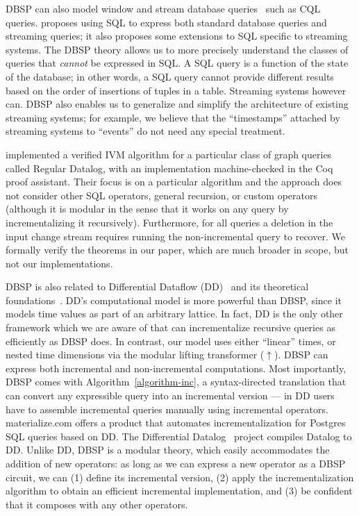 \documentclass[twocolumn
]{svjour3}
\numberwithin{equation}{section}
\newcommand{\dbsp}{DBSP\xspace}
\newcommand{\lift}[1]{{\uparrow}#1}
\begin{document}
\dbsp can also model window and stream database
queries~\cite{arasu-tr02,aurora} such as CQL queries.
\cite{begoli-sigmod19} proposes using SQL to express both standard
database queries and streaming queries; it also proposes some
extensions to SQL specific to streaming systems.  The \dbsp theory
allows us to more precisely understand the classes of queries that
\emph{cannot} be expressed in SQL.  A SQL query is a function of the
state of the database; in other words, a SQL query cannot provide
different results based on the order of insertions of tuples in a
table.  Streaming systems however can.  \dbsp also enables us to
generalize and simplify the architecture of existing streaming
systems; for example, we believe that the ``timestamps'' attached by
streaming systems to ``events'' do not need any special treatment.

\cite{bonifati-iclp2018} implemented a verified IVM algorithm for a
particular class of graph queries called Regular Datalog, with an
implementation machine-checked in the Coq proof assistant. Their focus
is on a particular algorithm and the approach does not consider other
SQL operators, general recursion, or custom operators (although it is
modular in the sense that it works on any query by incrementalizing it
recursively). Furthermore, for all queries a deletion in the input
change stream requires running the non-incremental query to recover.
We formally verify the theorems in our paper, which are much broader
in scope, but not our implementations.

\dbsp is also related to Differential Dataflow
(DD)~\cite{mcsherry-cidr13,murray-sosp13,chothia-vldb16} and its
theoretical foundations~\cite{abadi-fossacs15}.  DD's computational
model is more powerful than \dbsp, since it models time values as part
of an arbitrary lattice.  In fact, DD is the only other framework
which we are aware of that can incrementalize recursive queries as
efficiently as \dbsp does.  In contrast, our model uses either
``linear'' times, or nested time dimensions via the modular lifting
transformer ($\lift{}$).  \dbsp can express both incremental and
non-incremental computations.  Most importantly, \dbsp comes with
Algorithm~\ref{algorithm-inc}, a syntax-directed translation that can
convert any expressible query into an incremental version --- in DD
users have to assemble incremental queries manually using incremental
operators.  materialize.com offers a product that automates
incrementalization for Postgres SQL queries based on DD.  The
Differential Datalog~\cite{ryzhyk-datalog19} project compiles Datalog
to DD.  Unlike DD, \dbsp is a modular theory, which easily
accommodates the addition of new operators: as long as we can express
a new operator as a \dbsp circuit, we can (1) define its incremental
version, (2) apply the incrementalization algorithm to obtain an
efficient incremental implementation, and (3) be confident that it
composes with any other operators.
\end{document}
